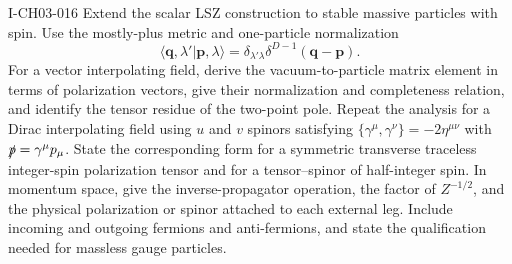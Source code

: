\begin{exercise}{I-CH03-016}
Extend the scalar LSZ construction to stable massive particles with spin.
Use the mostly-plus metric and one-particle normalization
\[
 \langle\mathbf q,\lambda'|\mathbf p,\lambda\rangle
 =\delta_{\lambda'\lambda}\delta^{D-1}(\mathbf q-\mathbf p).
\]
For a vector interpolating field, derive the vacuum-to-particle matrix element
in terms of polarization vectors, give their normalization and completeness
relation, and identify the tensor residue of the two-point pole.  Repeat the
analysis for a Dirac interpolating field using $u$ and $v$ spinors satisfying
$\{\gamma^\mu,\gamma^\nu\}=-2\eta^{\mu\nu}$ with $\slashed p=\gamma^\mu p_\mu$.  State the
corresponding form for a symmetric transverse traceless integer-spin
polarization tensor and for a tensor--spinor of half-integer spin.  In
momentum space, give the inverse-propagator operation, the factor of
$Z^{-1/2}$, and the physical polarization or spinor attached to each external
leg.  Include incoming and outgoing fermions and anti-fermions, and state the
qualification needed for massless gauge particles.
\end{exercise}
